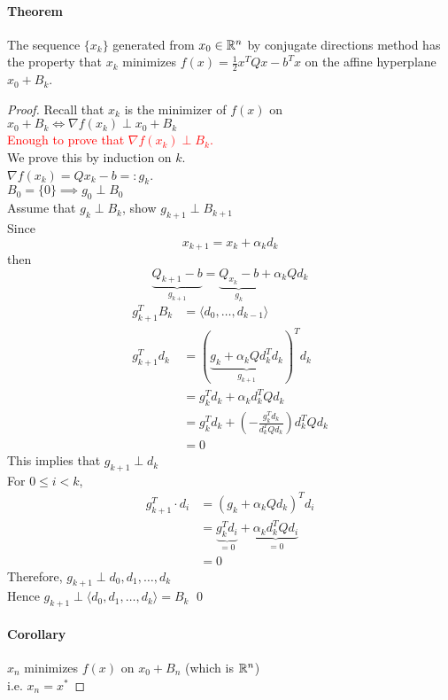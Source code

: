 \documentclass[11pt]{article}
\begin{document}
\paragraph{Theorem}
The sequence $\{x_k\}$ generated from $x_0 \in \mathbb{R}^n$ by conjugate directions method has the property that $x_k$ minimizes $f(x) = \frac{1}{2}x^TQx - b^Tx$ on the affine hyperplane $x_0 + B_k$. \\
\begin{proof}
	Recall that $x_k$ is the minimizer of $f(x)$ on $x_0 + B_k \iff \nabla f(x_k) \perp x_0 + B_k$ \\
	\textcolor{red}{Enough to prove that $\nabla f(x_k) \perp B_k$.} \\
	We prove this by induction on $k$. \\
	 $\nabla f(x_k) = Q x_k - b =: g_k$. \\
	 $B_0 = \{0\} \implies g_0 \perp B_0$ \\
	 Assume that $g_k \perp B_k$, show $g_{k+1} \perp B_{k+1}$ \\
	Since $$x_{k+1} = x_k + \alpha_k d_k$$
	then $$\underbrace{Q_{k+1} - b}_{g_{k+1}} = \underbrace{Q_{x_k} - b}_{g_k} + \alpha_k Q d_k$$
\begin{align}
	g_{k+1}^TB_k &= \langle d_0, \hdots, d_{k-1} \rangle \\
	g_{k+1}^Td_k &= (\underbrace{g_k + \alpha_k Q d_k^T d_k}_{g_{k+1}})^Td_k \\
	&= g_k^Td_k + \alpha_k d_k^T Q d_k \\
	&= g_k^Td_k + (- \frac{g_k^Td_k}{d_k^TQd_k})d_k^TQd_k \\
	&= 0
\end{align}
This implies that $g_{k+1} \perp d_k$ \\
For $0 \leq i < k$, 
\begin{align}
g_{k+1}^T\cdot d_i &= (g_k + \alpha_k Q d_k)^T d_i \\
&= \underbrace{g_k^Td_i}_{= 0} + \underbrace{\alpha_k d_k^T Q d_i}_{= 0} \\
&= 0	
\end{align}
Therefore, $g_{k+1} \perp d_0, d_1, \hdots, d_k$\\
Hence $g_{k+1} \perp \langle d_0, d_1, \hdots, d_k \rangle = B_k$
\qed 

\paragraph{Corollary} $x_n$ minimizes $f(x)$ on $x_0 + B_n$ (which is $\mathbb{R}^n$) \\
i.e. $x_n = x^*$ 

\end{proof}
\end{document}

